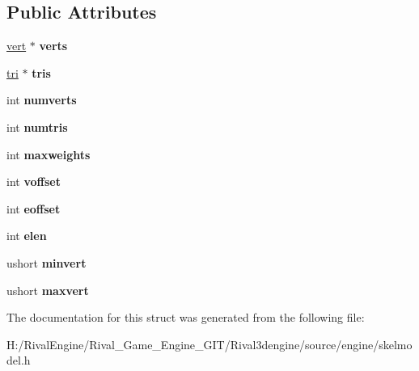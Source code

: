 \subsection*{Public Attributes}
\begin{DoxyCompactItemize}
\item 
\mbox{\label{structskelmodel_1_1skelmesh_a72c82fd851e4e181d8fd2ee318343f1d}} 
\hyperlink{structskelmodel_1_1vert}{vert} $\ast$ {\bfseries verts}
\item 
\mbox{\label{structskelmodel_1_1skelmesh_a2c6545626603fa2868cb8a3b43238aab}} 
\hyperlink{structskelmodel_1_1tri}{tri} $\ast$ {\bfseries tris}
\item 
\mbox{\label{structskelmodel_1_1skelmesh_a7beda358acb8f8b55c8ae464ffedc440}} 
int {\bfseries numverts}
\item 
\mbox{\label{structskelmodel_1_1skelmesh_adbc7d6b3df6bff521f42be68f1af2396}} 
int {\bfseries numtris}
\item 
\mbox{\label{structskelmodel_1_1skelmesh_a8f716f5d8183867ce613758d0d4a0a90}} 
int {\bfseries maxweights}
\item 
\mbox{\label{structskelmodel_1_1skelmesh_a37ab63e875d7cbf9736edec8172c6a17}} 
int {\bfseries voffset}
\item 
\mbox{\label{structskelmodel_1_1skelmesh_a3d74668507faceabbff8793a8b6d70fd}} 
int {\bfseries eoffset}
\item 
\mbox{\label{structskelmodel_1_1skelmesh_ad7147423c954141b887f55f021774ca0}} 
int {\bfseries elen}
\item 
\mbox{\label{structskelmodel_1_1skelmesh_abafe0b2316e9da9a9cecddb66fa3f63f}} 
ushort {\bfseries minvert}
\item 
\mbox{\label{structskelmodel_1_1skelmesh_a61a574d0bc6ca0a9c9778c435fdd90a6}} 
ushort {\bfseries maxvert}
\end{DoxyCompactItemize}


The documentation for this struct was generated from the following file\+:\begin{DoxyCompactItemize}
\item 
H\+:/\+Rival\+Engine/\+Rival\+\_\+\+Game\+\_\+\+Engine\+\_\+\+G\+I\+T/\+Rival3dengine/source/engine/skelmodel.\+h\end{DoxyCompactItemize}
